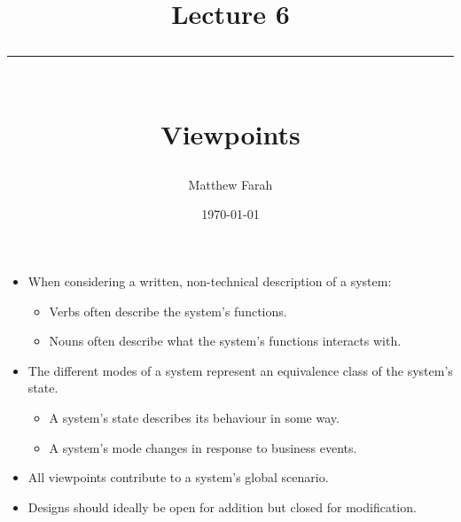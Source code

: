 \documentclass{article}
\date{
	\vspace{-.75em}
	{\large \today}
}
\title{
	\vspace*{-1.5em}
	{\Huge Lecture 6} \\
	\vspace{-1em}
	\rule{\textwidth/4}{.01em} \\
	\vspace{-.25em}
	{\Large Viewpoints}
	\vspace{-.75em}
}
\author{
	{\large Matthew Farah}
}
\begin{document}
\maketitle
\pagestyle{fancy}

\fi

\begin{itemize}
	\item When considering a written, non-technical description of a system:
	\begin{itemize}
		\item Verbs often describe the system's functions.
		\item Nouns often describe what the system's functions interacts with.
	\end{itemize}
	\item The different modes of a system represent an equivalence class of the system's state.
	\begin{itemize}
		\item A system's state describes its behaviour in some way.
		\item A system's mode changes in response to business events.
	\end{itemize}
	\item All viewpoints contribute to a system's global scenario.
	\item Designs should ideally be open for addition but closed for modification.
\end{itemize}

\ifdefined\iscombined
	\newpage
\else
	
\end{document}
